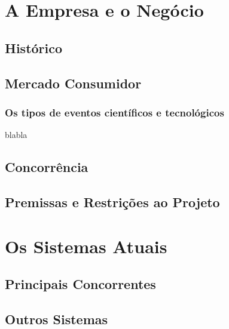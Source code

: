 \documentclass[a4paper]{abntex2}
\begin{document}
\chapter{A Empresa e o Negócio}


\section{Histórico}

\section{Mercado Consumidor}

\subsection{Os tipos de eventos científicos e tecnológicos}
\label{sec:eventos}
blabla

\section{Concorrência}

\section{Premissas e Restrições ao Projeto}

\chapter{Os Sistemas Atuais}

\section{Principais Concorrentes}


\section{Outros Sistemas}
\end{document}
